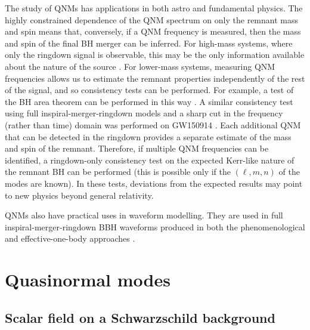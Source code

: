 The study of QNMs has applications in both astro and fundamental physics. 
The highly constrained dependence of the QNM spectrum on only the remnant mass and spin means that, conversely, if a QNM frequency is measured, then the mass and spin of the final BH merger can be inferred. 
For high-mass systems, where only the ringdown signal is observable, this may be the only information available about the nature of the source \cite{Berti:2005ys, Baibhav:2020tma}. 
For lower-mass systems, measuring QNM frequencies allows us to estimate the remnant properties independently of the rest of the signal, and so consistency tests can be performed. 
For example, a test of the BH area theorem can be performed in this way \cite{Cabero:2017avf, Isi:2020tac}. 
A similar consistency test using full inspiral-merger-ringdown models and a sharp cut in the frequency (rather than time) domain was performed on GW150914 \cite{LIGOScientific:2016lio}. 
Each additional QNM that can be detected in the ringdown provides a separate estimate of the mass and spin of the remnant. 
Therefore, if multiple QNM frequencies can be identified, a ringdown-only consistency test on the expected Kerr-like nature of the remnant BH can be performed \cite{Dreyer:2003bv, Carullo:2019flw} (this is possible only if the $(\ell, m, n)$ of the modes are known). 
In these tests, deviations from the expected results may point to new physics beyond general relativity. 

QNMs also have practical uses in waveform modelling.
They are used in full inspiral-merger-ringdown BBH waveforms produced in both the phenomenological \cite{Pratten:2020ceb, Garcia-Quiros:2020qpx, Pratten:2020fqn} and effective-one-body approaches \cite{Buonanno:2006ui, Buonanno:2007pf, Pan:2011gk}.



\section{Quasinormal modes}

\subsection{Scalar field on a Schwarzschild background}

